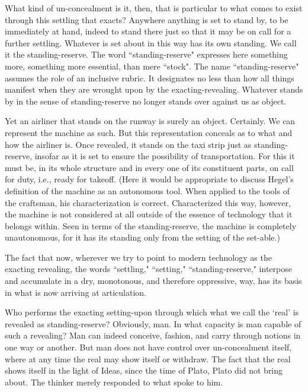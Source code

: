 \documentclass[12pt]{article}
\begin{document}
What kind of un-concealment is it, then, that is particular to what comes to exist through this settling that exacts? Anywhere anything is set to stand by, to be immediately at hand, indeed to stand there just so that it may be on call for a further settling. Whatever is set about in this way has its own standing. We call it the standing-reserve. The word ``standing-reserve" expresses here something more, something more essential, than mere ``stock". The name ``standing-reserve" assumes the role of an inclusive rubric. It designates no less than how all things manifest when they are wrought upon by the exacting-revealing. Whatever stands by in the sense of standing-reserve no longer stands over against us as object.

Yet an airliner that stands on the runway is surely an object. Certainly. We can represent the machine as such. But this representation conceals as to what and how the airliner is. Once revealed, it stands on the taxi strip just as standing-reserve, insofar as it is set to ensure the possibility of transportation. For this it must be, in its whole structure and in every one of its constituent parts, on call for duty, i.e., ready for takeoff. (Here it would be appropriate to discuss Hegel's definition of the machine as an autonomous tool. When applied to the tools of the craftsman, his characterization is correct. Characterized this way, however, the machine is not considered at all outside of the essence of technology that it belongs within. Seen in terms of the standing-reserve, the machine is completely unautonomous, for it has its standing only from the setting of the set-able.)

The fact that now, wherever we try to point to modern technology as the exacting revealing, the words ``settling," ``setting," ``standing-reserve," interpose and accumulate in a dry, monotonous, and therefore oppressive, way, has its basis in what is now arriving at articulation.

Who performs the exacting setting-upon through which what we call the `real' is revealed as standing-reserve? Obviously, man. In what capacity is man capable of such a revealing? Man can indeed conceive, fashion, and carry through notions in one way or another. But man does not have control over un-concealment itself, where at any time the real may show itself or withdraw. The fact that the real shows itself in the light of Ideas, since the time of Plato, Plato did not bring about. The thinker merely responded to what spoke to him.
\end{document}
